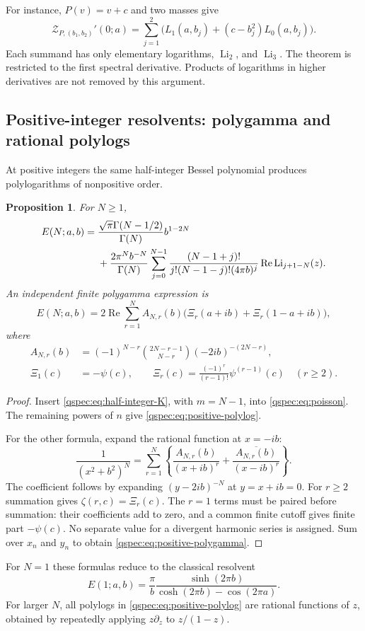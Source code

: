 \documentclass[11pt,letterpaper]{article}
\numberwithin{equation}{section}
\newtheorem{proposition}[theorem]{Proposition}
\theoremstyle{definition}
\newcommand{\Li}{\operatorname{Li}}
\newcommand{\Rea}{\operatorname{Re}}
\begin{document}
For instance, $P(v)=v+c$ and two masses give
\[
\mathcal Z_{P,(b_1,b_2)}'(0;a)
=\sum_{j=1}^2\bigl(L_1(a,b_j)+(c-b_j^2)L_0(a,b_j)\bigr).
\]
Each summand has only elementary logarithms, $\Li_2$, and $\Li_3$.
The theorem is restricted to the first spectral derivative. Products
of logarithms in higher derivatives are not removed by this argument.

\subsection{Positive-integer resolvents: polygamma and rational polylogs}
At positive integers the same half-integer Bessel polynomial produces
polylogarithms of nonpositive order.

\begin{proposition}\label{qspec:prop:positive}
For $N\ge1$,
\begin{align}
E(N;a,b)={}&\frac{\sqrt\pi\Gamma(N-1/2)}{\Gamma(N)}b^{1-2N}\notag\\
&+\frac{2\pi^N b^{-N}}{\Gamma(N)}
\sum_{j=0}^{N-1}\frac{(N-1+j)!}
 {j!(N-1-j)!(4\pi b)^j}\Rea\Li_{j+1-N}(z).
\label{qspec:eq:positive-polylog}
\end{align}
An independent finite polygamma expression is
\begin{equation}\label{qspec:eq:positive-polygamma}
E(N;a,b)=2\Rea\sum_{r=1}^N A_{N,r}(b)
\bigl(\Xi_r(a+ib)+\Xi_r(1-a+ib)\bigr),
\end{equation}
where
\begin{align}
A_{N,r}(b)&=(-1)^{N-r}\binom{2N-r-1}{N-r}(-2ib)^{-(2N-r)},\label{qspec:eq:Ar}\\
\Xi_1(c)&=-\psi(c),\qquad
\Xi_r(c)=\frac{(-1)^r}{(r-1)!}\psi^{(r-1)}(c)\quad(r\ge2).
\label{qspec:eq:Xi}
\end{align}
\end{proposition}
\begin{proof}
Insert \eqref{qspec:eq:half-integer-K}, with $m=N-1$, into
\eqref{qspec:eq:poisson}. The remaining powers of $n$ give
\eqref{qspec:eq:positive-polylog}.

For the other formula, expand the rational function at $x=-ib$:
\[
\frac1{(x^2+b^2)^N}
=\sum_{r=1}^N\left\{\frac{A_{N,r}(b)}{(x+ib)^r}
+\frac{\overline{A_{N,r}(b)}}{(x-ib)^r}\right\}.
\]
The coefficient follows by expanding $(y-2ib)^{-N}$ at $y=x+ib=0$.
For $r\ge2$ summation gives $\zeta(r,c)=\Xi_r(c)$. The $r=1$
terms must be paired before summation: their coefficients add to zero,
and a common finite cutoff gives finite part $-\psi(c)$. No separate
value for a divergent harmonic series is assigned. Sum over $x_n$
and $y_n$ to obtain \eqref{qspec:eq:positive-polygamma}.
\end{proof}
For $N=1$ these formulas reduce to the classical resolvent
\begin{equation}\label{qspec:eq:resolvent}
E(1;a,b)=\frac\pi b
\frac{\sinh(2\pi b)}{\cosh(2\pi b)-\cos(2\pi a)}.
\end{equation}
For larger $N$, all polylogs in
\eqref{qspec:eq:positive-polylog} are rational functions of $z$, obtained
by repeatedly applying $z\partial_z$ to $z/(1-z)$.
\end{document}
